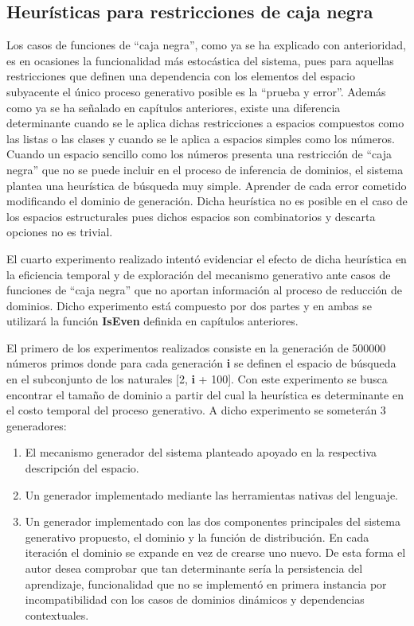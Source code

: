 \subsection{Heurísticas para restricciones de caja negra}

Los casos de funciones de “caja negra”, como ya se ha explicado con anterioridad, es en ocasiones la
funcionalidad más estocástica del sistema, pues para aquellas restricciones que definen una dependencia
con los elementos del espacio subyacente el único proceso generativo posible es la “prueba y error”.
Además como ya se ha señalado en capítulos anteriores, existe una diferencia determinante cuando se le
aplica dichas restricciones a espacios compuestos como las listas o las clases y cuando se le aplica a
espacios simples como los números. Cuando un espacio sencillo como los números presenta una restricción
de “caja negra” que no se puede incluir en el proceso de inferencia de dominios, el sistema plantea una
heurística de búsqueda muy simple. Aprender de cada error cometido modificando el dominio de generación.
Dicha heurística no es posible en el caso de los espacios estructurales pues dichos espacios son
combinatorios y descarta opciones no es trivial.

El cuarto experimento realizado intentó evidenciar el efecto de dicha heurística en la eficiencia temporal
y de exploración del mecanismo generativo ante casos de funciones de ``caja negra'' que no aportan información
al proceso de reducción de dominios. Dicho experimento está compuesto por dos partes y en ambas se utilizará
la función {\bf IsEven} definida en capítulos anteriores.

El primero de los experimentos realizados consiste en la generación de 500000 números primos donde para cada
generación {\bf i} se definen el espacio de búsqueda en el subconjunto de los naturales [2, {\bf i} + 100]. Con este
experimento se busca encontrar el tamaño de dominio a partir del cual la heurística es determinante en el
costo temporal del proceso generativo. A dicho experimento se someterán 3 generadores:
\begin{enumerate}

      \item  El mecanismo generador del sistema planteado apoyado en la respectiva descripción del espacio.
      \item  Un generador implementado mediante las herramientas nativas del lenguaje.
      \item  Un generador implementado con las dos componentes principales del sistema generativo propuesto, el
            dominio y la función de distribución. En cada iteración el dominio se expande en vez
            de crearse uno nuevo. De esta forma el autor desea comprobar que tan determinante sería la persistencia del
            aprendizaje, funcionalidad que no se implementó en primera instancia por incompatibilidad con los casos de
            dominios dinámicos y dependencias contextuales.
\end{enumerate}

